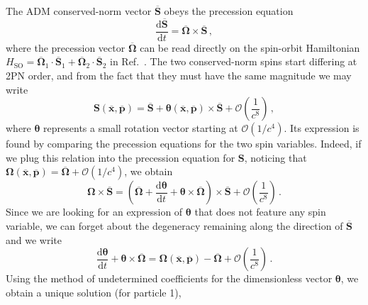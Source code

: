 \documentclass[
superscriptaddress,
preprint,
prd,tightenlines,showpacs,nofootinbib,
eqsecnum,
amsfonts,amsmath,amssymb]{revtex4-1}
\newcommand{\ovbf}[1]{\overline{\mathbf{#1}}}
\newcommand{\ud}{\mathrm{d}}
\newcommand{\calO}{\mathcal{O}}
\begin{document}
The ADM conserved-norm vector $\ovbf{S}$ obeys the precession
equation
%
\begin{equation}
	\frac{\ud \ovbf{S}}{\ud t} = \ovbf{\Omega} \times \ovbf{S} \, ,
\end{equation}
%
where the precession vector $\ovbf{\Omega}$ can be read directly on
the spin-orbit Hamiltonian $H_\mathrm{SO} = \ovbf{\Omega}_{1} \cdot
\ovbf{S}_{1} + \ovbf{\Omega}_{2} \cdot \ovbf{S}_{2}$ in
Ref.~\cite{Damour2008a}. The two conserved-norm spins start differing
at 2PN order, and from the fact that they must have the same magnitude
we may write
%
\begin{equation}
  \mathbf{S}(\ovbf{x},\ovbf{p}) = \ovbf{S} + 
  \bm{\theta}(\ovbf{x},\ovbf{p}) \times \ovbf{S} 
  + \mathcal{O}\left(\frac{1}{c^8}\right)\, ,
\end{equation}
%
where $\bm{\theta}$ represents a small rotation vector starting at
$\calO(1/c^4)$. Its expression is found by comparing the precession
equations for the two spin variables. Indeed, if we plug this relation into
the precession equation for $\mathbf{S}$, noticing that
$\mathbf{\Omega}(\ovbf{x},\ovbf{p}) = \ovbf{\Omega} + \calO(1/c^4)$, we
obtain
%
\begin{equation}
  \mathbf{\Omega} \times \ovbf{S} = \left( \ovbf{\Omega} + 
    \frac{\ud \bm{\theta}}{\ud t} + 
    \bm{\theta} \times \ovbf{\Omega} \right) \times \ovbf{S} + 
  \mathcal{O}\left(\frac{1}{c^8}\right)\, .
\end{equation}
%
Since we are looking for an expression of $\bm{\theta}$ that does not
feature any spin variable, we can forget about the degeneracy
remaining along the direction of $\ovbf{S}$ and we write
%
\begin{equation}
  \frac{\ud \bm{\theta}}{\ud t} + \bm{\theta} \times \ovbf{\Omega} = 
  \mathbf{\Omega}(\ovbf{x},\ovbf{p}) - \ovbf{\Omega} 
  + \mathcal{O}\left(\frac{1}{c^8}\right)\, .
\end{equation}
%
Using the method of undetermined coefficients for the dimensionless
vector $\bm{\theta}$, we obtain a unique solution (for particle 1),
%
\end{document}
